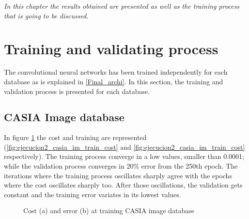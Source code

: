 
\begin{small}
\emph{In this chapter the results obtained are presented as well as the training process that is going to be discussed.\\}
\end{small}

\section{Training and validating process}
The convolutional neural networks has been trained independently for each database as is explained in \ref{Final_archi}. In this section, the training and validation process is presented for each database.\\
\subsection{CASIA Image database}
In figure \ref{fig:ejecucion2_casia_im_train} the cost and training are represented (\ref{fig:ejecucion2_casia_im_train_cost} and \ref{fig:ejecucion2_casia_im_train_cost} respectively). The training process converge in a low values, smaller than 0.0001; while the validation process converges in 20\% error from the 250th epoch. The iterations where the training process oscillates sharply agree with the epochs where the cost oscillates sharply too. After those oscillations, the validation gets constant and the training error variates in its lowest values.\\
\begin{figure}[htb]
\centering
\caption{Cost (a) and error (b) at training CASIA image database}
\label{fig:ejecucion2_casia_im_train}
\end{figure}

